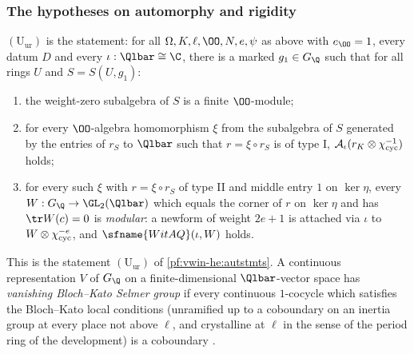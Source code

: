 \subsubsection{The hypotheses on automorphy and rigidity}

\begin{definition}\label{pf:eis:Uur}
$(\mathrm{U}_{\mathrm{ur}})$ is the statement: for all $\Omega,K,\ell,\OO,N,e,\psi$ as above with $e_\OO=1$, every datum $D$ and
every $\iota:\Qlbar\cong\C$, there is a marked $g_1\in G_\Q$ such that for all rings $U$ and $S=S(U,g_1)$:
\begin{enumerate}[label=(\alph*)]
\item the weight-zero subalgebra of $S$ is a finite $\OO$-module;
\item for every $\OO$-algebra homomorphism $\xi$ from the subalgebra of $S$ generated by the entries of $r_S$ to $\Qlbar$ such
  that $r=\xi\circ r_S$ is of type I, $\mathcal A_\iota(r_K\otimes\chi_{\mathrm{cyc}}^{-1})$ holds;
\item for every such $\xi$ with $r=\xi\circ r_S$ of type II and middle entry $1$ on $\ker\eta$, every
  $W:G_\Q\to\GL_2(\Qlbar)$ which equals the corner of $r$ on $\ker\eta$ and has $\tr W(c)=0$ is \emph{modular}: a newform of
  weight $2e+1$ is attached via $\iota$ to $W\otimes\chi_{\mathrm{cyc}}^{-e}$, and $\sfname{WitAQ}(\iota,W)$ holds.
\end{enumerate}
\end{definition}

This is the statement $(\mathrm{U}_{\mathrm{ur}})$ of \cref{pf:vwin-he:autstmts}. A continuous representation $V$ of $G_\Q$ on
a finite-dimensional $\Qlbar$-vector space has \emph{vanishing Bloch--Kato Selmer group} if every continuous $1$-cocycle
which satisfies the Bloch--Kato local conditions (unramified up to a coboundary on an inertia group at every place not above
$\ell$, and crystalline at $\ell$ in the sense of the period ring of the development) is a coboundary
\cite{BlochKato1990}.

